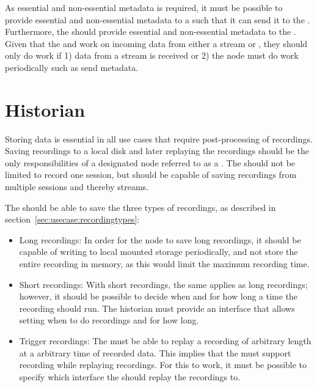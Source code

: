 
As essential and non-essential metadata is required, it must be possible to provide essential and non-essential metadata to a  such that it can send it to the . Furthermore, the \sub{} should provide essential and non-essential metadata to the \con{}.
Given that the  and  work on incoming data from either a stream or , they should only do work if 1) data from a stream is received or 2) the node must do work periodically such as send metadata.

\section{Historian} \label{sec:analysis:historian}

Storing data is essential in all use cases that require post-processing of recordings. Saving recordings to a local disk and later replaying the recordings should be the only responsibilities of a designated node referred to as a \hist{}.
The  should not be limited to record one session, but should be capable of saving recordings from multiple sessions and thereby streams. 

The \hist{} should be able to save the three types of recordings, as described in section~\ref{sec:usecase:recordingtypes}:
\begin{itemize}
	\item Long recordings:
		In order for the node to save long recordings, it should be capable of writing to local mounted storage periodically, and not store the entire recording in memory, as this would limit the maximum recording time.

	\item Short recordings:
		With short recordings, the same applies as long recordings; however, it should be possible to decide when and for how long a time the recording should run. The historian must provide an interface that allows setting when to do recordings and for how long.
		
	\item Trigger recordings:
		The  must be able to replay a recording of arbitrary length at a arbitrary time of recorded data. This implies that the  must support recording while replaying recordings. For this to work, it must be possible to specify which interface the  should replay the recordings to.
\end{itemize}

